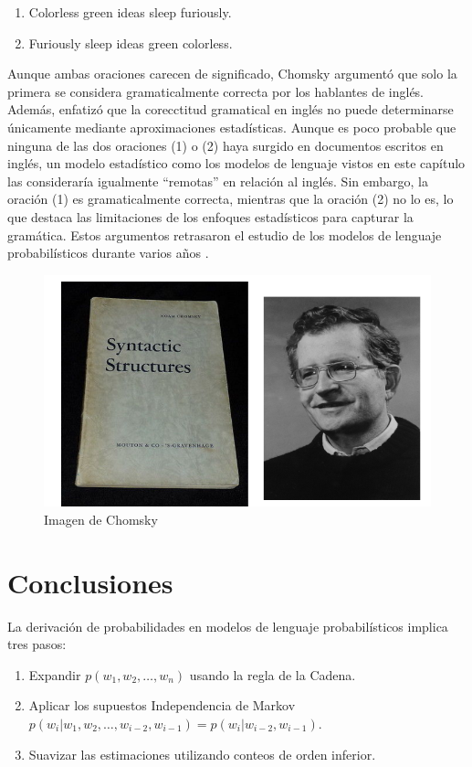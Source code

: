 \documentclass[11pt,fleqn]{book} %
\begin{document}
\begin{enumerate}
    \item Colorless green ideas sleep furiously.
    \item Furiously sleep ideas green colorless.
\end{enumerate}

Aunque ambas oraciones carecen de significado, Chomsky argumentó que solo la primera se considera gramaticalmente correcta por los hablantes de inglés. Además, enfatizó que la corecctitud gramatical en inglés no puede determinarse únicamente mediante aproximaciones estadísticas. Aunque es poco probable que ninguna de las dos oraciones (1) o (2) haya surgido en documentos escritos en inglés, un modelo estadístico como los modelos de lenguaje vistos en este capítulo las consideraría igualmente ``remotas'' en relación al inglés. Sin embargo, la oración (1) es gramaticalmente correcta, mientras que la oración (2) no lo es, lo que destaca las limitaciones de los enfoques estadísticos para capturar la gramática. Estos argumentos retrasaron el estudio de los modelos de lenguaje probabilísticos durante varios años \cite{JurafskyBook}.

\begin{figure}[h]
    \centering
    \includegraphics[scale = 0.4]{pics/chomsky.png}
    \caption{Imagen de Chomsky}
    \label{fig:chomsky}
\end{figure}


\section{Conclusiones}
La derivación de probabilidades en modelos de lenguaje probabilísticos implica tres pasos:
    \begin{enumerate}
        \item Expandir $p(w_1, w_2, \ldots, w_n)$ usando la regla de la Cadena.
        \item Aplicar los supuestos Independencia de Markov \\
        $p(w_i | w_1, w_2, \ldots, w_{i-2}, w_{i-1}) = p(w_i | w_{i-2}, w_{i-1})$.
        \item Suavizar las estimaciones utilizando conteos de orden inferior.
    \end{enumerate}
    
\end{document}
